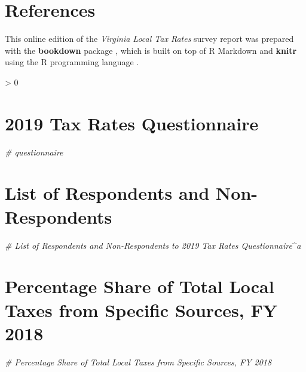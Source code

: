 \documentclass[
]{book}
\newenvironment{Shaded}{\begin{snugshade}}{\end{snugshade}}
\newcommand{\CommentTok}[1]{\textcolor[rgb]{0.56,0.35,0.01}{\textit{#1}}}
\newlength{\cslhangindent}
\newenvironment{CSLReferences}[2] %
 {%
  \setlength{\parindent}{0pt}
  \ifodd #1 \everypar{\setlength{\hangindent}{\cslhangindent}}\ignorespaces\fi
  \ifnum #2 > 0
  \setlength{\parskip}{#2\baselineskip}
  \fi
 }%
 {}
\begin{document}
\hypertarget{references}{%
\chapter*{References}\label{references}}

This online edition of the \emph{Virginia Local Tax Rates} survey report was prepared with the \textbf{bookdown} package \citep{R-bookdown}, which is built on top of R Markdown and \textbf{knitr} \citep{xie2015} using the R programming language \citep{R-base}.

\hypertarget{refs}{}
\begin{CSLReferences}{0}{0}
\end{CSLReferences}

\hypertarget{appendix-appendix}{%
\appendix}


\hypertarget{tax-rates-questionnaire}{%
\chapter{2019 Tax Rates Questionnaire}\label{tax-rates-questionnaire}}

\begin{Shaded}
\begin{Highlighting}[]
\CommentTok{\# questionnaire}
\end{Highlighting}
\end{Shaded}

\hypertarget{list-of-respondents-and-non-respondents}{%
\chapter{List of Respondents and Non-Respondents}\label{list-of-respondents-and-non-respondents}}

\begin{Shaded}
\begin{Highlighting}[]
\CommentTok{\# List of Respondents and Non{-}Respondents to 2019 Tax Rates Questionnaire$\^{}a$}
\end{Highlighting}
\end{Shaded}

\hypertarget{secn:Appendix-C}{%
\chapter{Percentage Share of Total Local Taxes from Specific Sources, FY 2018}\label{secn:Appendix-C}}

\begin{Shaded}
\begin{Highlighting}[]
\CommentTok{\# Percentage Share of Total Local Taxes from Specific Sources, FY 2018}
\end{Highlighting}
\end{Shaded}
\end{document}
